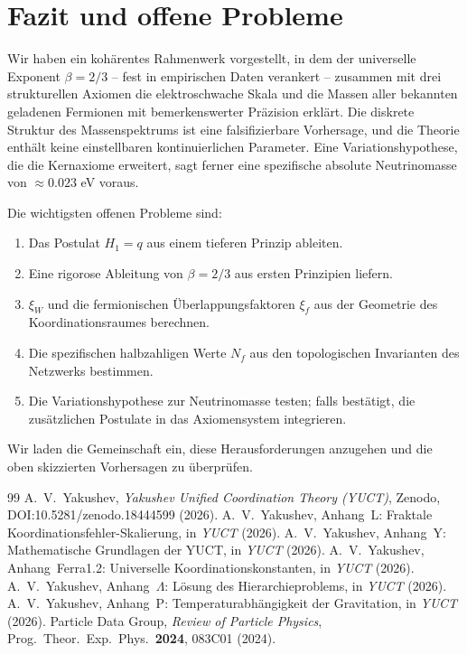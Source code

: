 \documentclass[12pt,a4paper]{article}
\begin{document}
	
	\section{Fazit und offene Probleme}
	
	Wir haben ein kohärentes Rahmenwerk vorgestellt, in dem der universelle Exponent \(\beta = 2/3\) – fest in empirischen Daten verankert – zusammen mit drei strukturellen Axiomen die elektroschwache Skala und die Massen aller bekannten geladenen Fermionen mit bemerkenswerter Präzision erklärt.  Die diskrete Struktur des Massenspektrums ist eine falsifizierbare Vorhersage, und die Theorie enthält keine einstellbaren kontinuierlichen Parameter.  Eine Variationshypothese, die die Kernaxiome erweitert, sagt ferner eine spezifische absolute Neutrinomasse von \(\approx 0.023\) eV voraus.
	
	Die wichtigsten offenen Probleme sind:
	\begin{enumerate}[label=(\roman*)]
		\item Das Postulat \(H_1 = q\) aus einem tieferen Prinzip ableiten.
		\item Eine rigorose Ableitung von \(\beta = 2/3\) aus ersten Prinzipien liefern.
		\item \(\xi_W\) und die fermionischen Überlappungsfaktoren \(\xi_f\) aus der Geometrie des Koordinationsraumes berechnen.
		\item Die spezifischen halbzahligen Werte \(N_f\) aus den topologischen Invarianten des Netzwerks bestimmen.
		\item Die Variationshypothese zur Neutrinomasse testen; falls bestätigt, die zusätzlichen Postulate in das Axiomensystem integrieren.
	\end{enumerate}
	Wir laden die Gemeinschaft ein, diese Herausforderungen anzugehen und die oben skizzierten Vorhersagen zu überprüfen.
	
	\begin{thebibliography}{99}
		 A.~V.~Yakushev, \emph{Yakushev Unified Coordination Theory (YUCT)}, Zenodo, DOI:10.5281/zenodo.18444599 (2026).
		 A.~V.~Yakushev, Anhang~L: Fraktale Koordinationsfehler-Skalierung, in \emph{YUCT} (2026).
		 A.~V.~Yakushev, Anhang~Y: Mathematische Grundlagen der YUCT, in \emph{YUCT} (2026).
		 A.~V.~Yakushev, Anhang~Ferra1.2: Universelle Koordinationskonstanten, in \emph{YUCT} (2026).
		 A.~V.~Yakushev, Anhang~\(\Lambda\): Lösung des Hierarchieproblems, in \emph{YUCT} (2026).
		 A.~V.~Yakushev, Anhang~P: Temperaturabhängigkeit der Gravitation, in \emph{YUCT} (2026).
		 Particle Data Group, \emph{Review of Particle Physics}, Prog.\ Theor.\ Exp.\ Phys.\ \textbf{2024}, 083C01 (2024).
	\end{thebibliography}
	
\end{document}
